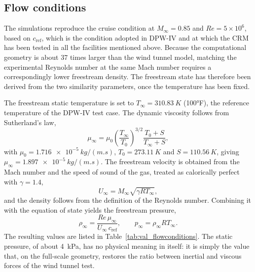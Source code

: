 \subsection{Flow conditions}
\label{sec:val_flow}

The simulations reproduce the cruise condition at $M_\infty = 0.85$ and $Re = 5\times10^{6}$, based on $c_\mathrm{ref}$, which is the condition adopted in DPW-IV and at which the CRM has been tested in all the facilities mentioned above. Because the computational geometry is about 37 times larger than the wind tunnel model, matching the experimental Reynolds number at the same Mach number requires a correspondingly lower freestream density. The freestream state has therefore been derived from the two similarity parameters, once the temperature has been fixed.

The freestream static temperature is set to $T_\infty = \SI{310.83}{K}$ (\ang{100}F), the reference temperature of the DPW-IV test case. The dynamic viscosity follows from Sutherland's law,
\begin{equation}
  \mu_\infty = \mu_0 \left( \frac{T_\infty}{T_0} \right)^{3/2} \frac{T_0 + S}{T_\infty + S},
  \label{eq:val_sutherland}
\end{equation}
with $\mu_0 = \SI{1.716e-5}{kg/(m.s)}$, $T_0 = \SI{273.11}{K}$ and $S = \SI{110.56}{K}$, giving $\mu_\infty = \SI{1.897e-5}{kg/(m.s)}$. The freestream velocity is obtained from the Mach number and the speed of sound of the gas, treated as calorically perfect with $\gamma = 1.4$,
\begin{equation}
  U_\infty = M_\infty \sqrt{\gamma R T_\infty},
  \label{eq:val_velocity}
\end{equation}
and the density follows from the definition of the Reynolds number. Combining it with the equation of state yields the freestream pressure,
\begin{equation}
  \rho_\infty = \frac{Re\, \mu_\infty}{U_\infty\, c_\mathrm{ref}}, \qquad p_\infty = \rho_\infty R T_\infty .
  \label{eq:val_pressure}
\end{equation}
The resulting values are listed in Table~\ref{tab:val_flowconditions}. The static pressure, of about \SI{4}{kPa}, has no physical meaning in itself: it is simply the value that, on the full-scale geometry, restores the ratio between inertial and viscous forces of the wind tunnel test.

